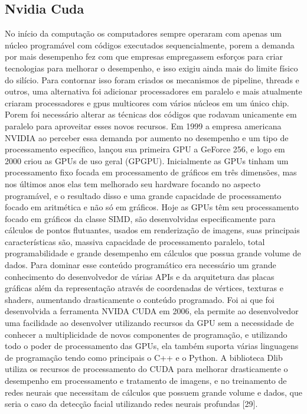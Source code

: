 \subsection{Nvidia Cuda}
No início da computação os computadores sempre operaram com apenas um núcleo programável com códigos executados sequencialmente, porem a demanda por mais desempenho fez com que empresas empregassem esforços para criar tecnologias para melhorar o desempenho, e isso exigiu ainda mais do limite físico do silício. Para contornar isso foram criados os mecanismos de pipeline, threads e outros, uma alternativa foi adicionar processadores em paralelo e mais atualmente criaram processadores e gpus multicores com vários núcleos em um único chip. Porem foi necessário alterar as técnicas dos códigos que rodavam unicamente em paralelo para aproveitar esses novos recursos.
Em 1999 a empresa americana NVIDIA ao perceber essa demanda por aumento no desempenho e um tipo de processamento específico, lançou sua primeira GPU a GeForce 256, e logo em 2000 criou as GPUs de uso geral (GPGPU).
Inicialmente as GPUs tinham um processamento fixo focada em processamento de gráficos em três dimensões, mas nos últimos anos elas tem melhorado seu hardware focando no aspecto programável, e o resultado disso e uma grande capacidade de processamento focado em aritmética e não só em gráficos.
Hoje as GPUs têm seu processamento focado em gráficos da classe SIMD, são desenvolvidas especificamente para cálculos de pontos flutuantes, usados em renderização de imagens, suas principais características são, massiva capacidade de processamento paralelo, total programabilidade e grande desempenho em cálculos que possua grande volume de dados. Para dominar esse conteúdo programático era necessário um grande conhecimento do desenvolvedor de várias APIs e da arquitetura das placas gráficas além da representação através de coordenadas de vértices, texturas e shaders, aumentando drasticamente o conteúdo programado.
Foi ai que foi desenvolvida a ferramenta NVIDA CUDA em 2006, ela permite ao desenvolvedor uma facilidade ao desenvolver utilizando recursos da GPU sem a necessidade de conhecer a multiplicidade de novos componentes de programação, e utilizando todo o poder de processamento das GPUs, ela também suporta várias linguagens de programação tendo como principais o C++ e o Python.
A biblioteca Dlib utiliza os recursos de processamento do CUDA para melhorar drasticamente o desempenho em processamento e tratamento de imagens, e no treinamento de redes neurais que necessitam de cálculos que possuem grande volume e dados, que seria o caso da detecção facial utilizando redes neurais profundas [29].

